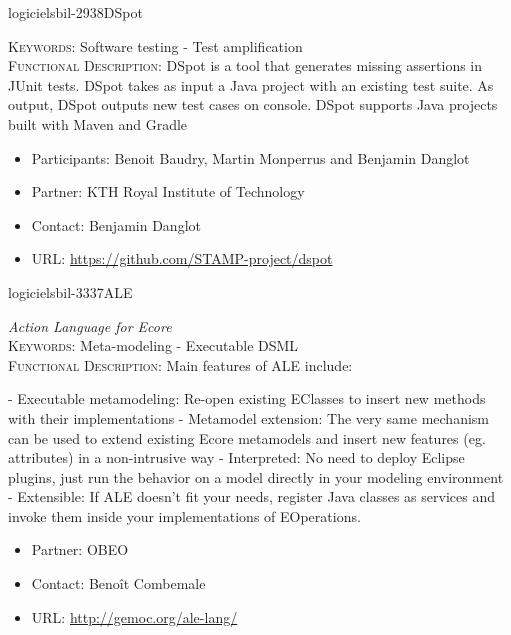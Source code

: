 \documentclass{ra2018}
\begin{document}
 \begin{module}{logiciels}{bil-2938}{DSpot}

   \textsc{Keywords:} Software testing - Test amplification \\ 


   

 \textsc{Functional Description:}  DSpot is a tool that generates missing assertions in JUnit tests. DSpot takes as input a Java project with an existing test suite. As output, DSpot outputs new test cases on console. DSpot supports Java projects built with Maven and Gradle\\

   \begin{itemize}
      \item Participants: Benoit Baudry, Martin Monperrus and Benjamin Danglot
      \item Partner: KTH Royal Institute of Technology
      \item Contact: Benjamin Danglot
      \item URL: \url{https://github.com/STAMP-project/dspot}
   \end{itemize}

 \end{module}

 \begin{module}{logiciels}{bil-3337}{ALE}

 \textit{Action Language for Ecore} \\ 


   \textsc{Keywords:} Meta-modeling - Executable DSML \\ 


   

 \textsc{Functional Description:}  Main features of ALE include:

- Executable metamodeling: Re-open existing EClasses to insert new methods with their implementations
- Metamodel extension: The very same mechanism can be used to extend existing Ecore metamodels and insert new features (eg. attributes) in a non-intrusive way
-    Interpreted: No need to deploy Eclipse plugins, just run the behavior on a model directly in your modeling environment
-    Extensible: If ALE doesn’t fit your needs, register Java classes as services and invoke them inside your implementations of EOperations.\\

   \begin{itemize}
      \item Partner: OBEO
      \item Contact: Benoît Combemale
      \item URL: \url{http://gemoc.org/ale-lang/}
   \end{itemize}

 \end{module}
\end{document}
